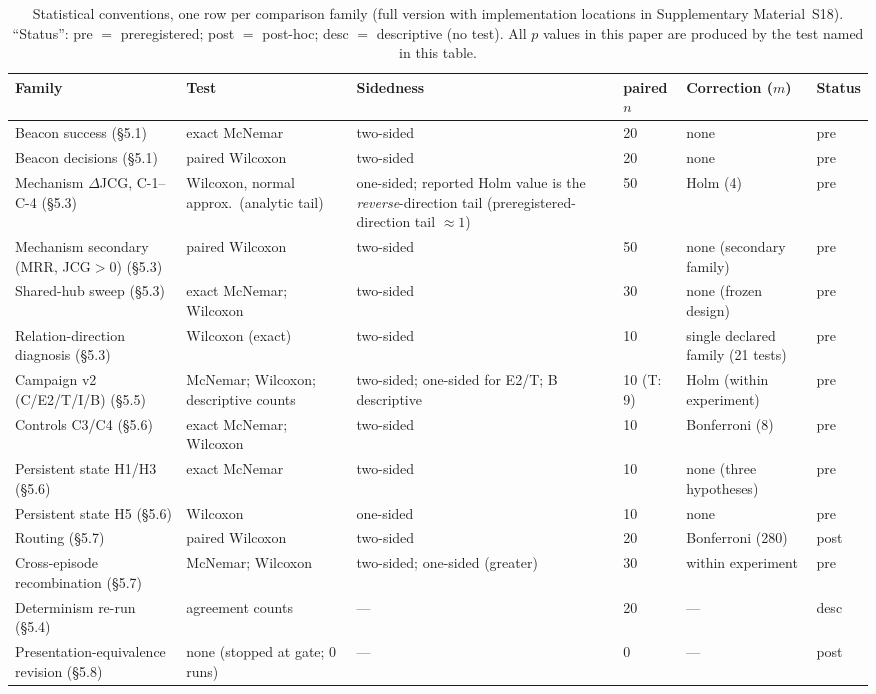 \documentclass[10pt]{article}
\begin{document}
\begin{table}[t]
\centering\footnotesize
\caption{Statistical conventions, one row per comparison family (full version with implementation locations in Supplementary Material~S18). ``Status'': pre $=$ preregistered; post $=$ post-hoc; desc $=$ descriptive (no test). All $p$ values in this paper are produced by the test named in this table.}
\label{tab:stats}
\begin{tabular}{L{3.0cm}L{3.4cm}L{2.2cm}L{1.1cm}L{2.2cm}L{0.9cm}}
\toprule
\textbf{Family} & \textbf{Test} & \textbf{Sidedness} & \textbf{paired $n$} & \textbf{Correction ($m$)} & \textbf{Status} \\
\midrule
Beacon success (\S5.1) & exact McNemar & two-sided & 20 & none & pre \\
Beacon decisions (\S5.1) & paired Wilcoxon & two-sided & 20 & none & pre \\
Mechanism $\Delta$JCG, C-1--C-4 (\S5.3) & Wilcoxon, normal approx.\ (analytic tail) & one-sided; reported Holm value is the \emph{reverse}-direction tail (preregistered-direction tail ${\approx}1$) & 50 & Holm (4) & pre \\
Mechanism secondary (MRR, JCG${>}0$) (\S5.3) & paired Wilcoxon & two-sided & 50 & none (secondary family) & pre \\
Shared-hub sweep (\S5.3) & exact McNemar; Wilcoxon & two-sided & 30 & none (frozen design) & pre \\
Relation-direction diagnosis (\S5.3) & Wilcoxon (exact) & two-sided & 10 & single declared family (21 tests) & pre \\
Campaign v2 (C/E2/T/I/B) (\S5.5) & McNemar; Wilcoxon; descriptive counts & two-sided; one-sided for E2/T; B descriptive & 10 (T: 9) & Holm (within experiment) & pre \\
Controls C3/C4 (\S5.6) & exact McNemar; Wilcoxon & two-sided & 10 & Bonferroni (8) & pre \\
Persistent state H1/H3 (\S5.6) & exact McNemar & two-sided & 10 & none (three hypotheses) & pre \\
Persistent state H5 (\S5.6) & Wilcoxon & one-sided & 10 & none & pre \\
Routing (\S5.7) & paired Wilcoxon & two-sided & 20 & Bonferroni (280) & post \\
Cross-episode recombination (\S5.7) & McNemar; Wilcoxon & two-sided; one-sided (greater) & 30 & within experiment & pre \\
Determinism re-run (\S5.4) & agreement counts & --- & 20 & --- & desc \\
Presentation-equivalence revision (\S5.8) & none (stopped at gate; 0 runs) & --- & 0 & --- & post \\
\bottomrule
\end{tabular}
\end{table}
\end{document}
